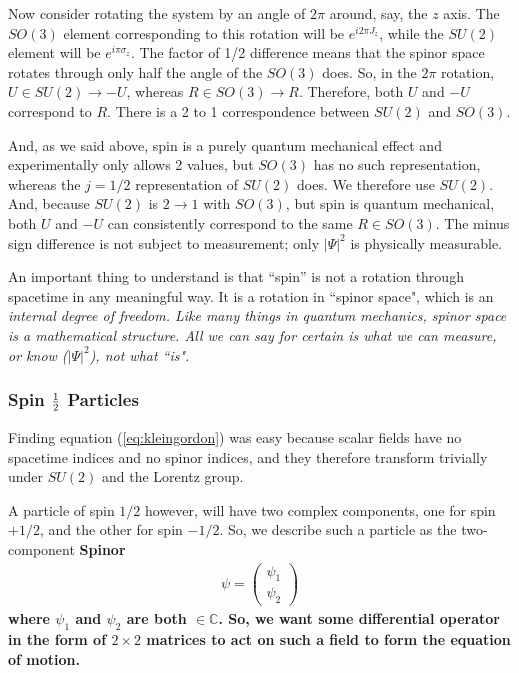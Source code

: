\documentclass[12pt,epsf]{article}
\def\nolabel{\nonumber }
\def\nolabel{\nonumber }
\begin{document}
Now consider rotating the system by an angle of $2\pi$ around, say, the
$z$ axis.  The $SO(3)$ element corresponding to this rotation will be
$e^{i2\pi J_z}$, while the $SU(2)$ element will be $e^{i\pi \sigma_z}$.
 The factor of 1/2 difference means that the spinor space rotates
through only half the angle of the $SO(3)$ does.  So, in the $2\pi$
rotation, $U\in SU(2) \rightarrow -U$, whereas $R \in SO(3)\rightarrow
R$.  Therefore, both $U$ and $-U$ correspond to $R$.  There is a 2 to
1 correspondence between $SU(2)$ and $SO(3)$.  

And, as we said above, spin is a purely quantum mechanical effect and
experimentally only allows 2 values, but $SO(3)$ has no such
representation, whereas the $j=1/2$ representation of $SU(2)$ does.  We
therefore use $SU(2)$.	And, because $SU(2)$ is $2\rightarrow1$ with
$SO(3)$, but spin is quantum mechanical, both $U$ and $-U$ can
consistently correspond to the same $R\in SO(3)$.  The minus sign
difference is not subject to measurement; only $|\Psi|^2$ is physically
measurable.  

An important thing to understand is that ``spin'' is not a rotation
through spacetime in any meaningful way.  It is a rotation in ``spinor
space", which is an \it internal \rm degree of freedom.  Like many
things in quantum mechanics, spinor space is a mathematical structure. 
All we can say for certain is what we can measure, or know
($|\Psi|^2$), not what ``is".  

\subsubsection{Spin ${1\over 2}$ Particles}

Finding equation (\ref{eq:kleingordon}) was easy because scalar fields
have no spacetime indices and no spinor indices, and they therefore
transform trivially under $SU(2)$ and the Lorentz group.  

A particle of spin $1/2$ however, will have two complex components, one
for spin $+1/2$, and the other for spin $-1/2$.  So, we describe such a
particle as the two-component \bf Spinor \rm
\begin{eqnarray}
\psi = \begin{pmatrix}
\psi_1 \\ \psi_2
\end{pmatrix}\nolabel
\end{eqnarray}
where $\psi_1$ and $\psi_2$ are both $\in \mathbb{C}$.	So, we want
some differential operator in the form of $2\times 2$ matrices to act
on such a field to form the equation of motion.  
\end{document}
